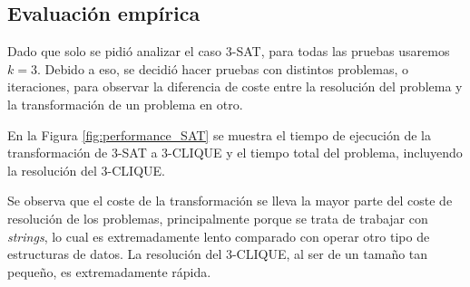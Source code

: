 \subsection*{Evaluación empírica}
Dado que solo se pidió analizar el caso 3-SAT, para todas las pruebas usaremos $k=3$. Debido a eso, se decidió hacer pruebas con distintos problemas, o iteraciones, para observar la diferencia de coste entre la resolución del problema y la transformación de un problema en otro.

En la Figura \ref{fig:performance_SAT} se muestra el tiempo de ejecución de la transformación de 3-SAT a 3-CLIQUE y el tiempo total del problema, incluyendo la resolución del 3-CLIQUE.


Se observa que el coste de la transformación se lleva la mayor parte del coste de resolución de los problemas, principalmente porque se trata de trabajar con \textit{strings}, lo cual es extremadamente lento comparado con operar otro tipo de estructuras de datos. La resolución del 3-CLIQUE, al ser de un tamaño tan pequeño, es extremadamente rápida.
